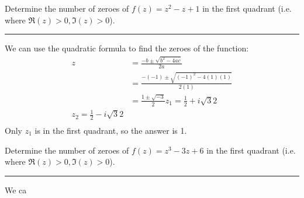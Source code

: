 \begin{example}

    Determine the number of zeroes of $f(z) = z^2 - z + 1$ in the first quadrant (i.e. where $\Re(z) > 0, \Im(z) > 0$).

    \hrule
    \vspace{0.5cm}
    We can use the quadratic formula to find the zeroes of the function:
    \begin{align}
        z & = \frac{-b \pm \sqrt{b^2 - 4ac}}{2a}             \\
          & = \frac{-(-1) \pm \sqrt{(-1)^2 - 4(1)(1)}}{2(1)} \\
          & = \frac{1 \pm \sqrt{-3}}{2}
        z_1 = \frac{1}2 + i\sqrt{3}2                         \\
        z_2 = \frac{1}2 - i\sqrt{3}2                         \\
    \end{align}
    Only $z_1$ is in the first quadrant, so the answer is 1.
\end{example}

\begin{example}

    Determine the number of zeroes of $f(z) = z^3 - 3z + 6$ in the first quadrant (i.e. where $\Re(z) > 0, \Im(z) > 0$).

    \hrule
    \vspace{0.5cm}

    We ca
\end{example}